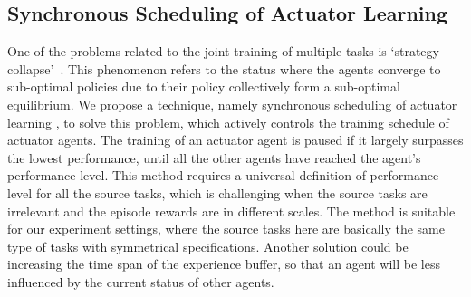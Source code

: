 \subsection{Synchronous Scheduling of Actuator Learning}
One of the problems related to the joint training of multiple tasks is `strategy collapse'~\cite{openai_2018}. This phenomenon refers to the status where the agents converge to sub-optimal policies due to their policy collectively form a sub-optimal equilibrium. We propose a technique, namely synchronous scheduling of actuator learning , to solve this problem, which actively controls the training schedule of actuator agents. The training of an actuator agent is paused if it largely surpasses the lowest performance, until all the other agents have reached the agent's performance level. This method requires a universal definition of performance level for all the source tasks, which is challenging when the source tasks are irrelevant and the episode rewards are in different scales. The method is suitable for our experiment settings, where the source tasks here are basically the same type of tasks with symmetrical specifications. Another solution could be increasing the time span of the experience buffer, so that an agent will be less influenced by the current status of other agents.

